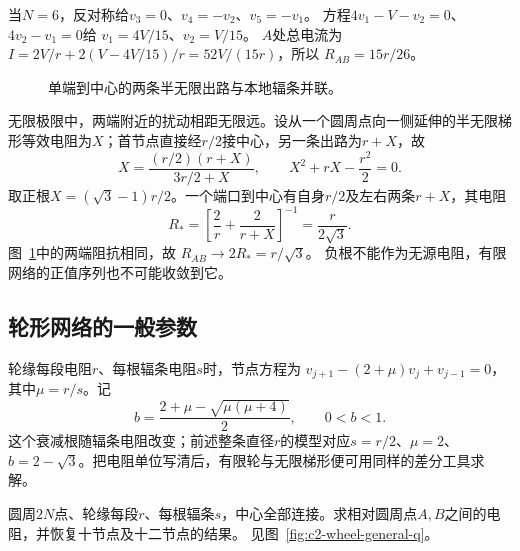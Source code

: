\begin{solution}
当$N=6$，反对称给$v_3=0$、$v_4=-v_2$、$v_5=-v_1$。
方程$4v_1-V-v_2=0$、$4v_2-v_1=0$给
$v_1=4V/15$、$v_2=V/15$。
$A$处总电流为
$I=2V/r+2(V-4V/15)/r=52V/(15r)$，所以
$\boxed{R_{AB}=15r/26}$。

\begin{figure}[H]\centering
{}
\caption{单端到中心的两条半无限出路与本地辐条并联。}\label{fig:c2-wheel6-s}
\end{figure}

无限极限中，两端附近的扰动相距无限远。设从一个圆周点向一侧延伸的半无限梯形等效电阻为$X$；首节点直接经$r/2$接中心，另一条出路为$r+X$，故
\[
 X=\frac{(r/2)(r+X)}{3r/2+X},\qquad
 X^2+rX-\frac{r^2}{2}=0.
\]
取正根$X=(\sqrt3-1)r/2$。一个端口到中心有自身$r/2$及左右两条$r+X$，其电阻
\[
 R_*=\left[\frac2r+\frac2{r+X}\right]^{-1}
 =\frac{r}{2\sqrt3}.
\]
图~\ref{fig:c2-wheel6-s}中的两端阻抗相同，故
$\boxed{R_{AB}\to2R_*=r/\sqrt3}$。
负根不能作为无源电阻，有限网络的正值序列也不可能收敛到它。
\end{solution}

\subsection{轮形网络的一般参数}
轮缘每段电阻$r$、每根辐条电阻$s$时，节点方程为
$v_{j+1}-(2+\mu)v_j+v_{j-1}=0$，其中$\mu=r/s$。记
\[
 b=\frac{2+\mu-\sqrt{\mu(\mu+4)}}2,\qquad0<b<1.
\]
这个衰减根随辐条电阻改变；前述整条直径$r$的模型对应$s=r/2$、$\mu=2$、$b=2-\sqrt3$。把电阻单位写清后，有限轮与无限梯形便可用同样的差分工具求解。

\begin{example}[一般辐条的有限轮]\label{ex:c2-wheel-general}
圆周$2N$点、轮缘每段$r$、每根辐条$s$，中心全部连接。求相对圆周点$A,B$之间的电阻，并恢复十节点及十二节点的结果。 见图~\ref{fig:c2-wheel-general-q}。
\end{example}

